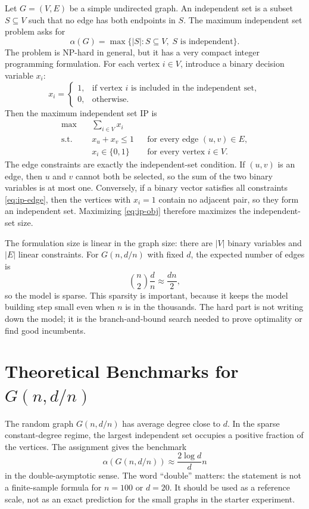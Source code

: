 \documentclass[11pt]{article}
\begin{document}
Let $G=(V,E)$ be a simple undirected graph. An independent set is a subset
$S \subseteq V$ such that no edge has both endpoints in $S$. The maximum
independent set problem asks for
\[
  \alpha(G) = \max\{|S|: S \subseteq V,\; S \text{ is independent}\}.
\]
The problem is NP-hard in general, but it has a very compact integer
programming formulation. For each vertex $i \in V$, introduce a binary decision
variable $x_i$:
\[
  x_i =
  \begin{cases}
  1, & \text{if vertex } i \text{ is included in the independent set},\\
  0, & \text{otherwise}.
  \end{cases}
\]
Then the maximum independent set IP is
\begin{align}
\max \quad & \sum_{i \in V} x_i \label{eq:ip-obj}\\
\text{s.t.} \quad & x_u + x_v \leq 1 && \text{for every edge } (u,v) \in E,
  \label{eq:ip-edge}\\
& x_i \in \{0,1\} && \text{for every vertex } i \in V. \label{eq:ip-bin}
\end{align}
The edge constraints are exactly the independent-set condition. If $(u,v)$ is
an edge, then $u$ and $v$ cannot both be selected, so the sum of the two binary
variables is at most one. Conversely, if a binary vector satisfies all
constraints \eqref{eq:ip-edge}, then the vertices with $x_i=1$ contain no
adjacent pair, so they form an independent set. Maximizing
\eqref{eq:ip-obj} therefore maximizes the independent-set size.

The formulation size is linear in the graph size: there are $|V|$ binary
variables and $|E|$ linear constraints. For $G(n,d/n)$ with fixed $d$, the
expected number of edges is
\[
  \binom{n}{2}\frac{d}{n} \approx \frac{dn}{2},
\]
so the model is sparse. This sparsity is important, because it keeps the model
building step small even when $n$ is in the thousands. The hard part is not
writing down the model; it is the branch-and-bound search needed to prove
optimality or find good incumbents.

\section{Theoretical Benchmarks for $G(n,d/n)$}

The random graph $G(n,d/n)$ has average degree close to $d$. In the sparse
constant-degree regime, the largest independent set occupies a positive
fraction of the vertices. The assignment gives the benchmark
\[
  \alpha(G(n,d/n)) \approx \frac{2\log d}{d}n
\]
in the double-asymptotic sense. The word ``double'' matters: the statement is
not a finite-sample formula for $n=100$ or $d=20$. It should be used as a
reference scale, not as an exact prediction for the small graphs in the starter
experiment.
\end{document}
